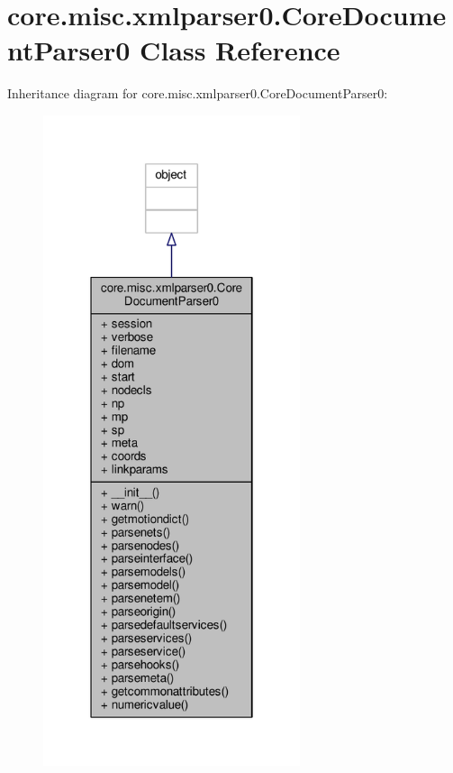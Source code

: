 \hypertarget{classcore_1_1misc_1_1xmlparser0_1_1_core_document_parser0}{\section{core.\+misc.\+xmlparser0.\+Core\+Document\+Parser0 Class Reference}
\label{classcore_1_1misc_1_1xmlparser0_1_1_core_document_parser0}
}


Inheritance diagram for core.\+misc.\+xmlparser0.\+Core\+Document\+Parser0\+:
\nopagebreak
\begin{figure}[H]
\begin{center}
\leavevmode
\includegraphics[width=214pt]{classcore_1_1misc_1_1xmlparser0_1_1_core_document_parser0__inherit__graph}
\end{center}
\end{figure}


